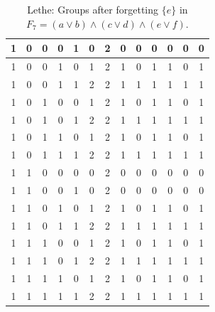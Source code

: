\begin{table}[!tb]
\begin{tabular}{|c|c|c|c|c|c|c|c|c|c|c|c|c|}
        \rowcolor{red!40} 1 & 0 & 0 & 0 & 1 & 0 & 2 & 0 & 0 & 0 & 0 & 0 & 0 \\ \hline
        \rowcolor{green!40} 1 & 0 & 0 & 1 & 0 & 1 & 2 & 1 & 0 & 1 & 1 & 0 & 1 \\ \hline
        \rowcolor{yellow!40} 1 & 0 & 0 & 1 & 1 & 2 & 2 & 1 & 1 & 1 & 1 & 1 & 1 \\ \hline
        \rowcolor{gray!40} 1 & 0 & 1 & 0 & 0 & 1 & 2 & 1 & 0 & 1 & 1 & 0 & 1 \\ \hline
        \rowcolor{blue!40} 1 & 0 & 1 & 0 & 1 & 2 & 2 & 1 & 1 & 1 & 1 & 1 & 1 \\ \hline
        \rowcolor{red!40} 1 & 0 & 1 & 1 & 0 & 1 & 2 & 1 & 0 & 1 & 1 & 0 & 1 \\ \hline
        \rowcolor{green!40} 1 & 0 & 1 & 1 & 1 & 2 & 2 & 1 & 1 & 1 & 1 & 1 & 1 \\ \hline
        \rowcolor{yellow!40} 1 & 1 & 0 & 0 & 0 & 0 & 2 & 0 & 0 & 0 & 0 & 0 & 0 \\ \hline
        \rowcolor{gray!40} 1 & 1 & 0 & 0 & 1 & 0 & 2 & 0 & 0 & 0 & 0 & 0 & 0 \\ \hline
        \rowcolor{blue!40} 1 & 1 & 0 & 1 & 0 & 1 & 2 & 1 & 0 & 1 & 1 & 0 & 1 \\ \hline
        \rowcolor{red!40} 1 & 1 & 0 & 1 & 1 & 2 & 2 & 1 & 1 & 1 & 1 & 1 & 1 \\ \hline
        \rowcolor{green!40} 1 & 1 & 1 & 0 & 0 & 1 & 2 & 1 & 0 & 1 & 1 & 0 & 1 \\ \hline
        \rowcolor{yellow!40} 1 & 1 & 1 & 0 & 1 & 2 & 2 & 1 & 1 & 1 & 1 & 1 & 1 \\ \hline
        \rowcolor{gray!40} 1 & 1 & 1 & 1 & 0 & 1 & 2 & 1 & 0 & 1 & 1 & 0 & 1 \\ \hline
        \rowcolor{blue!40} 1 & 1 & 1 & 1 & 1 & 2 & 2 & 1 & 1 & 1 & 1 & 1 & 1 \\ \hline
    \end{tabular}
    \caption{Lethe: Groups after forgetting $\{e\}$ in $F_{7} = (a \lor b) \land (c \lor d) \land (e \lor f)$.}
    \label{tab:lethe-F7-e-groups}
\end{table}
